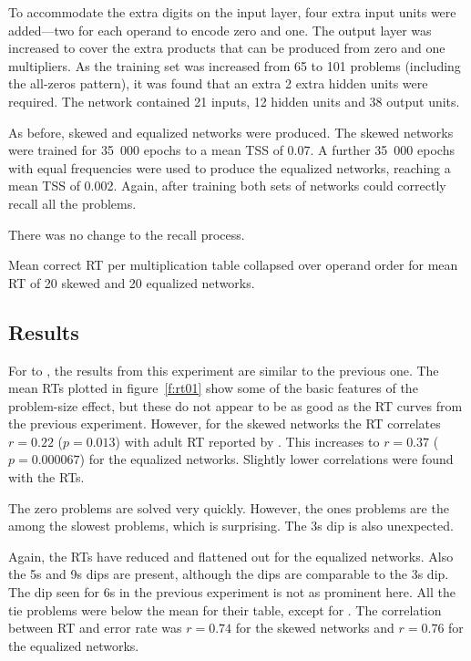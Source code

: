 To accommodate the extra digits on the input layer, four extra input units
were added---two for each operand to encode zero and one.  The output layer
was increased to cover the extra products that can be produced from zero
and one multipliers.  As the training set was increased from 65 to 101
problems (including the all-zeros pattern), it was found that an extra 2
extra hidden units were required. The network contained 21 inputs, 12
hidden units and 38 output units.

As before, skewed and equalized networks were produced. The skewed networks
were trained for 35~000 epochs to a mean TSS
of 0.07.  A further 35~000 epochs with
equal frequencies were used to produce the equalized networks, reaching a
mean TSS of 0.002.  Again, after training both sets of networks could
correctly recall all the problems.

There was no change to the recall process.

\begin{fancyfigure}
\centerline{}
\caption{Mean correct RT per multiplication table collapsed over
operand order for mean RT of 20 skewed and 20 equalized networks.}
\label{f:rt01}
\end{fancyfigure}


\subsection{Results}

For  to , the results from this experiment are similar to the
previous one. The mean RTs plotted in figure~\ref{f:rt01} show some of the
basic features of the problem-size effect, but these do not appear to be as
good as the RT curves from the previous experiment.
However, for the skewed networks the RT correlates $r=0.22$
($p=0.013$) with adult RT reported by . This increases to
$r=0.37$ ($p=0.000067$) for the equalized networks. Slightly lower
correlations were found with the  RTs.

The zero problems are solved very quickly.  However, the ones
problems are the among the slowest problems, which is surprising. The 3s
dip is also unexpected.

Again, the RTs have reduced and flattened out for the equalized networks.
Also the 5s and 9s dips
are present, although the dips are comparable to the 3s
dip.  The dip seen for 6s in the previous experiment is not as prominent
here.  All the tie problems were below the mean for their table, except for
. The correlation between RT and error rate was $r=0.74$ for the skewed
networks and $r=0.76$ for the equalized networks.

